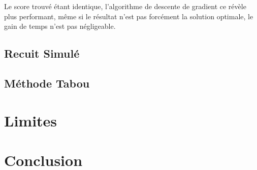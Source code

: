 \documentclass[a4paper]{article}
\begin{document}
Le score trouvé étant identique, l'algorithme de descente de gradient ce révèle plus performant, même si le résultat n'est pas forcément la solution optimale, le gain de temps n'est pas négligeable.\\

\subsection{Recuit Simulé}

\subsection{Méthode Tabou}

\section{Limites}

\section{Conclusion}
\end{document}

